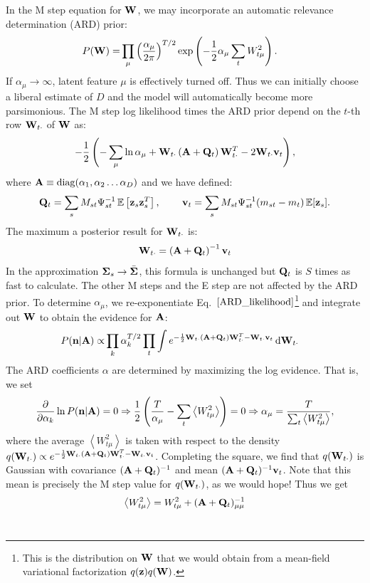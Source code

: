 \documentclass[nofootinbib,amssymb,amsmath]{revtex4}
\newcommand{\ave}[1]{\left\langle #1 \right\rangle}
\newcommand{\vv}{{\bf v}}
\newcommand{\vz}{{\bf z}}
\newcommand{\vn}{{\bf n}}
\newcommand{\vQ}{{\bf Q}}
\newcommand{\vW}{{\bf W}}
\newcommand{\vSigma}{{\bf \Sigma}}
\newcommand{\vA}{{\bf A}}
\newcommand{\EE}{\mathbb{E}}
\begin{document}
In the M step equation for $\vW$, we may incorporate an automatic relevance determination (ARD) prior:
%
\begin{align}
P(\vW) =& \prod_\mu \left( \frac{\alpha_\mu}{2 \pi} \right)^{T/2} \exp \left( -\frac{1}{2} \alpha_\mu \sum_t W_{t\mu}^2  \right).
\end{align}
%
If $\alpha_\mu \rightarrow \infty$, latent feature $\mu$ is effectively turned off. Thus we can initially choose a liberal estimate of $D$ and the model will automatically become more parsimonious. The M step log likelihood times the ARD prior depend on the $t$-th row $\vW_{t \cdot}$ of $\vW$ as:
%
\begin{equation*}
 -\frac{1}{2}   \left( -\sum_\mu \ln \alpha_\mu  + \vW_{t \cdot} \left(\vA +  \vQ_t  \right) \vW_{t \cdot}^T - 2 \vW_{t \cdot} \vv_t  \right),
 \label{ARD_likelihood}
\end{equation*}
%
where $\vA \equiv {\rm diag}(\alpha_1, \alpha_2 \ldots \alpha_D)$ and we have defined:
%
\begin{equation}
\vQ_t = \sum_s M_{st} \Psi_{st}^{-1} \, \EE\left[\vz_s \vz_s^T\right], \, \qquad \vv_t = \sum_s M_{st} \Psi_{st}^{-1} (m_{st} - m_t)\, \EE[\vz_s].
\end{equation}
%
The maximum a posterior result for $\vW_{t \cdot}$ is:
%
\begin{equation}
\vW_{t \cdot} = \left(  \vA + \vQ_t \right)^{-1} \vv_t
\label{M_step_W}
\end{equation}
%
In the approximation $\vSigma_s \rightarrow \bar{\vSigma}$, this formula is unchanged but $\vQ_t$ is $S$ times as fast to calculate. The other M steps and the E step are not affected by the ARD prior. To determine $\alpha_\mu$, we re-exponentiate Eq.~$\eqref{ARD_likelihood}$\footnote{This is the distribution on $\vW$ that we would obtain from a mean-field variational factorization $q(\vz) q(\vW)$.} and integrate out $\vW$ to obtain the evidence for $\vA$:
%
\begin{align}
P(\vn | \vA) \propto& \prod_k \alpha_k^{T/2} \prod_t \int e^{-\frac{1}{2} \vW_{t \cdot} (\vA + \vQ_t) \vW_{t \cdot}^T - \vW_{t \cdot} \vv_t} \, \mathrm{d} \vW_{t \cdot}
\label{ARD_evidence}
\end{align}
%
The ARD coefficients $\alpha$ are determined by maximizing the log evidence.  That is, we set
\begin{align}
\frac{\partial}{\partial \alpha_k} \ln P(\vn | \vA) = 0 \Rightarrow  \frac{1}{2} \left( \frac{T}{\alpha_\mu}  - \sum_t \ave{W_{t\mu}^2} \right) = 0 \Rightarrow \alpha_\mu = \frac{T}{\sum_t \ave{W_{t\mu}^2}},
\end{align}
where the average $\ave{W_{t\mu}^2}$ is taken with respect to the density $q(\vW_{t \cdot}) \propto e^{-\frac{1}{2} \vW_{t \cdot} (\vA + \vQ_t) \vW_{t \cdot}^T - \vW_{t \cdot} \vv_t}$.  Completing the square, we find that $q(\vW_{t \cdot})$ is Gaussian with covariance $(\vA + \vQ_t)^{-1}$ and mean $(\vA + \vQ_t)^{-1} \vv_t$.  Note that this mean is precisely the M step value for $q(\vW_{t \cdot})$, as we would hope!  Thus we get
%
\begin{equation}
\ave{W_{t\mu}^2} = W_{t\mu}^2 + (\vA + \vQ_t)^{-1}_{\mu\mu}
\end{equation}\\
%
\end{document}
